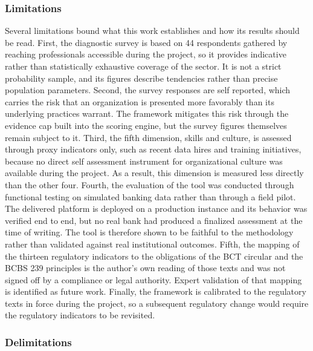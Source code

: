 \subsubsection{Limitations}

Several limitations bound what this work establishes and how its results should be read. First, the diagnostic survey is based on 44 respondents gathered by reaching professionals accessible during the project, so it provides indicative rather than statistically exhaustive coverage of the sector. It is not a strict probability sample, and its figures describe tendencies rather than precise population parameters. Second, the survey responses are self reported, which carries the risk that an organization is presented more favorably than its underlying practices warrant. The framework mitigates this risk through the evidence cap built into the scoring engine, but the survey figures themselves remain subject to it. Third, the fifth dimension, skills and culture, is assessed through proxy indicators only, such as recent data hires and training initiatives, because no direct self assessment instrument for organizational culture was available during the project. As a result, this dimension is measured less directly than the other four. Fourth, the evaluation of the tool was conducted through functional testing on simulated banking data rather than through a field pilot. The delivered platform is deployed on a production instance and its behavior was verified end to end, but no real bank had produced a finalized assessment at the time of writing. The tool is therefore shown to be faithful to the methodology rather than validated against real institutional outcomes. Fifth, the mapping of the thirteen regulatory indicators to the obligations of the BCT circular and the BCBS 239 principles is the author's own reading of those texts and was not signed off by a compliance or legal authority. Expert validation of that mapping is identified as future work. Finally, the framework is calibrated to the regulatory texts in force during the project, so a subsequent regulatory change would require the regulatory indicators to be revisited.

\subsubsection{Delimitations}

